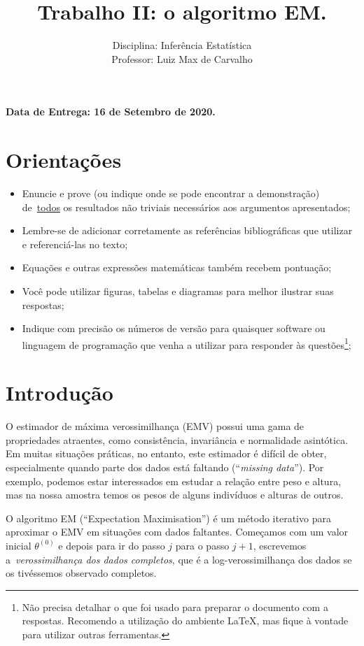 \documentclass[a4paper,10pt, notitlepage]{report}
\title{Trabalho II: o algoritmo EM.}
\author{Disciplina: Inferência Estatística \\ Professor: Luiz Max de Carvalho}
\begin{document}
\maketitle

\textbf{Data de Entrega: 16 de Setembro de 2020.}

\section*{Orientações}
\begin{itemize}
 \item Enuncie e prove (ou indique onde se pode encontrar a demonstração) de~\underline{todos} os resultados não triviais necessários aos argumentos apresentados;
 \item Lembre-se de adicionar corretamente as referências bibliográficas que utilizar e referenciá-las no texto;
 \item Equações e outras expressões matemáticas também recebem pontuação;
 \item Você pode utilizar figuras, tabelas e diagramas para melhor ilustrar suas respostas;
 \item Indique com precisão os números de versão para quaisquer software ou linguagem de programação que venha a utilizar para responder às questões\footnote{Não precisa detalhar o que foi usado para preparar o documento com a respostas. Recomendo a utilização do ambiente LaTeX, mas fique à vontade para utilizar outras ferramentas.};
 \end{itemize}


\section*{Introdução}

O estimador de máxima verossimilhança (EMV) possui uma gama de propriedades atraentes, como consistência, invariância e normalidade asintótica.
Em muitas situações práticas, no entanto, este estimador é difícil de obter, especialmente quando parte dos dados está faltando (``\textit{missing data}'').
Por exemplo, podemos estar interessados em estudar a relação entre peso e altura, mas na nossa amostra temos os pesos de alguns indivíduos e alturas de outros.

O algoritmo EM (``Expectation Maximisation'') é um método iterativo para aproximar o EMV em situações com dados faltantes.
Começamos com um valor inicial $\theta^{(0)}$ e depois para ir do passo $j$ para o passo $j + 1$, escrevemos a~\textit{verossimilhança dos dados completos}, que é a log-verossimilhança dos dados se os tivéssemos observado completos.
\end{document}
